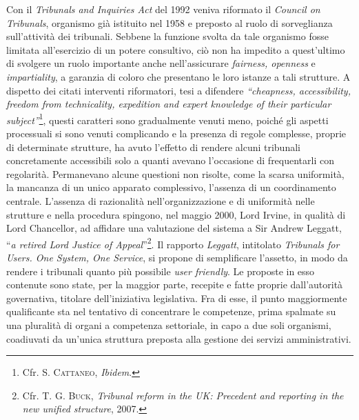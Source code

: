 \documentclass[12pt,it,a4paper,]{report}
\begin{document}
Con il \emph{Tribunals and Inquiries Act} del 1992 veniva riformato il
\emph{Council on Tribunals}, organismo già istituito nel 1958 e preposto
al ruolo di sorveglianza sull'attività dei tribunali. Sebbene la
funzione svolta da tale organismo fosse limitata all'esercizio di un
potere consultivo, ciò non ha impedito a quest'ultimo di svolgere un
ruolo importante anche nell'assicurare \emph{fairness, openness} e
\emph{impartiality}, a garanzia di coloro che presentano le loro istanze
a tali strutture. A dispetto dei citati interventi riformatori, tesi a
difendere \emph{``cheapness, accessibility, freedom from technicality,
expedition and expert knowledge of their particular
subject''}\footnote{Cfr. S. \textsc{Cattaneo}, \emph{Ibidem}.}, questi
caratteri sono gradualmente venuti meno, poiché gli aspetti processuali
si sono venuti complicando e la presenza di regole complesse, proprie di
determinate strutture, ha avuto l'effetto di rendere alcuni tribunali
concretamente accessibili solo a quanti avevano l'occasione di
frequentarli con regolarità. Permanevano alcune questioni non risolte,
come la scarsa uniformità, la mancanza di un unico apparato complessivo,
l'assenza di un coordinamento centrale. L'assenza di razionalità
nell'organizzazione e di uniformità nelle strutture e nella procedura
spingono, nel maggio 2000, Lord Irvine, in qualità di Lord Chancellor,
ad affidare una valutazione del sistema a Sir Andrew Leggatt, ``\emph{a
retired Lord Justice of Appeal}''\footnote{Cfr. T. G. \textsc{Buck},
  \emph{Tribunal reform in the UK: Precedent and reporting in the new
  unified structure}, 2007.}. Il rapporto \emph{Leggatt}, intitolato
\emph{Tribunals for Users. One System, One Service}, si propone di
semplificare l'assetto, in modo da rendere i tribunali quanto più
possibile \emph{user friendly}. Le proposte in esso contenute sono
state, per la maggior parte, recepite e fatte proprie dall'autorità
governativa, titolare dell'iniziativa legislativa. Fra di esse, il punto
maggiormente qualificante sta nel tentativo di concentrare le
competenze, prima spalmate su una pluralità di organi a competenza
settoriale, in capo a due soli organismi, coadiuvati da un'unica
struttura preposta alla gestione dei servizi amministrativi.
\end{document}
